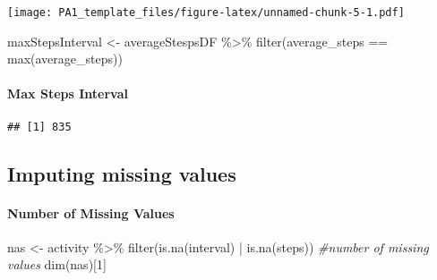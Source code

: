 \documentclass[
]{article}
\newenvironment{Shaded}{\begin{snugshade}}{\end{snugshade}}
\newcommand{\CommentTok}[1]{\textcolor[rgb]{0.56,0.35,0.01}{\textit{#1}}}
\newcommand{\DecValTok}[1]{\textcolor[rgb]{0.00,0.00,0.81}{#1}}
\newcommand{\FunctionTok}[1]{\textcolor[rgb]{0.00,0.00,0.00}{#1}}
\newcommand{\NormalTok}[1]{#1}
\newcommand{\OtherTok}[1]{\textcolor[rgb]{0.56,0.35,0.01}{#1}}
\newcommand{\SpecialCharTok}[1]{\textcolor[rgb]{0.00,0.00,0.00}{#1}}
\begin{document}
\texttt{[image: PA1\_template\_files/figure-latex/unnamed-chunk-5-1.pdf]}

\begin{Shaded}
\begin{Highlighting}[]
\NormalTok{maxStepsInterval }\OtherTok{\textless{}{-}}\NormalTok{ averageStespsDF }\SpecialCharTok{\%\textgreater{}\%} \FunctionTok{filter}\NormalTok{(average\_steps }\SpecialCharTok{==} \FunctionTok{max}\NormalTok{(average\_steps))}
\end{Highlighting}
\end{Shaded}

\hypertarget{max-steps-interval}{%
\paragraph{Max Steps Interval}\label{max-steps-interval}}

\begin{Shaded}
\end{Shaded}

\begin{verbatim}
## [1] 835
\end{verbatim}

\hypertarget{imputing-missing-values}{%
\subsection{Imputing missing values}\label{imputing-missing-values}}

\hypertarget{number-of-missing-values}{%
\paragraph{Number of Missing Values}\label{number-of-missing-values}}

\begin{Shaded}
\begin{Highlighting}[]
\NormalTok{nas }\OtherTok{\textless{}{-}}\NormalTok{ activity }\SpecialCharTok{\%\textgreater{}\%} \FunctionTok{filter}\NormalTok{(}\FunctionTok{is.na}\NormalTok{(interval) }\SpecialCharTok{|} \FunctionTok{is.na}\NormalTok{(steps))}
\CommentTok{\#number of missing values}
\FunctionTok{dim}\NormalTok{(nas)[}\DecValTok{1}\NormalTok{]}
\end{Highlighting}
\end{Shaded}
\end{document}
